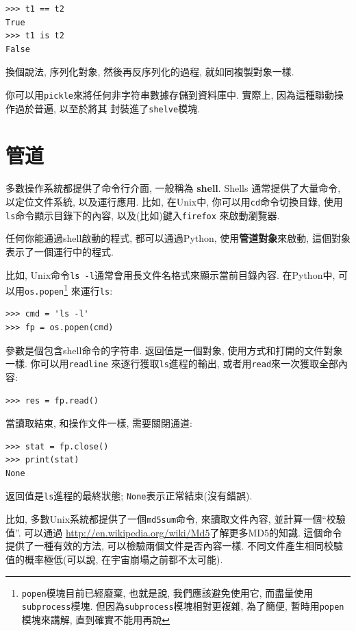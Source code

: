 \documentclass[10pt]{book}
\begin{document}
\begin{verbatim}
>>> t1 == t2
True
>>> t1 is t2
False
\end{verbatim}
%
換個說法, 序列化對象, 然後再反序列化的過程, 就如同複製對象一樣. 

你可以用{\tt pickle}來將任何非字符串數據存儲到資料庫中. 
實際上, 因為這種聯動操作過於普遍, 以至於將其
封裝進了{\tt shelve}模塊.  


\section{管道}

多數操作系統都提供了命令行介面, 一般稱為 {\bf shell}.
Shells 通常提供了大量命令, 以定位文件系統, 以及運行應用. 
比如, 在Unix中, 你可以用{\tt cd}命令切換目錄, 
使用{\tt ls}命令顯示目錄下的內容, 以及(比如)鍵入{\tt firefox} 來啟動瀏覽器. 

任何你能通過shell啟動的程式, 都可以通過Python, 使用{\bf 管道對象}來啟動, 這個對象表示了一個運行中的程式. 

比如, Unix命令{\tt ls -l}通常會用長文件名格式來顯示當前目錄內容. 
在Python中, 可以用{\tt os.popen}\footnote{{\tt popen}模塊目前已經廢棄, 
也就是說, 我們應該避免使用它, 而盡量使用{\tt subprocess}模塊. 
但因為{\tt subprocess}模塊相對更複雜, 為了簡便, 
暫時用{\tt popen}模塊來講解, 直到確實不能用再說} 來運行{\tt ls}:

\begin{verbatim}
>>> cmd = 'ls -l'
>>> fp = os.popen(cmd)
\end{verbatim}
%
參數是個包含shell命令的字符串. 
返回值是一個對象, 使用方式和打開的文件對象一樣. 
你可以用{\tt readline} 來逐行獲取{\tt ls}進程的輸出, 
或者用{\tt read}來一次獲取全部內容:

\begin{verbatim}
>>> res = fp.read()
\end{verbatim}
%
當讀取結束, 和操作文件一樣, 需要關閉通道:

\begin{verbatim}
>>> stat = fp.close()
>>> print(stat)
None
\end{verbatim}
%
返回值是{\tt ls}進程的最終狀態;
{\tt None}表示正常結束(沒有錯誤).

比如, 多數Unix系統都提供了一個{\tt md5sum}命令, 
來讀取文件內容, 並計算一個``校驗值''. 
可以通過 \url{http://en.wikipedia.org/wiki/Md5}了解更多MD5的知識. 
這個命令提供了一種有效的方法, 可以檢驗兩個文件是否內容一樣. 
不同文件產生相同校驗值的概率極低(可以說, 在宇宙崩塌之前都不太可能). 
\end{document}
